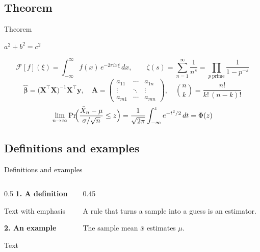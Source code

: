 \documentclass[aspectratio=1610,xcolor=dvipsnames]{beamer}
\begin{document}
\subsection{Theorem}
\begin{frame}{Theorem}
    \begin{theorem}[Pythagoras]
        $a^{2}+b^{2}=c^{2}$
    \end{theorem}

    \begin{theorem}
        \[
            \mathcal{F}[f](\xi)=\int_{-\infty}^{\infty} f(x)\,e^{-2\pi i x\xi}\,dx,\qquad
            \zeta(s)=\sum_{n=1}^{\infty}\frac{1}{n^{s}}=\prod_{p\ \mathrm{prime}}\frac{1}{1-p^{-s}}
        \]
        \[
            \hat{\boldsymbol\beta}=\bigl(\mathbf{X}^{\top}\mathbf{X}\bigr)^{-1}\mathbf{X}^{\top}\mathbf{y},\quad
            \mathbf{A}=\begin{pmatrix}a_{11}&\cdots&a_{1n}\\\vdots&\ddots&\vdots\\a_{m1}&\cdots&a_{mn}\end{pmatrix},\quad
            \binom{n}{k}=\frac{n!}{k!\,(n-k)!}
        \]
        \[
            \lim_{n\to\infty}\Pr\!\Bigl(\frac{\bar{X}_n-\mu}{\sigma/\sqrt{n}}\le z\Bigr)
            =\frac{1}{\sqrt{2\pi}}\int_{-\infty}^{z}e^{-t^{2}/2}\,dt=\Phi(z)
        \]
    \end{theorem}
\end{frame}

\subsection{Definitions and examples}
\begin{frame}[fragile]{Definitions and examples}
\begin{columns}[T,onlytextwidth]
\begin{column}{0.5\textwidth}
\textbf{1. A definition}\par\smallskip
\begin{codeonly}
\begin{definition}[Title]
  Text with \alert{emphasis}
\end{definition}
\end{codeonly}
\smallskip
\textbf{2. An example}\par\smallskip
\begin{codeonly}
\begin{example}
  Text
\end{example}
\end{codeonly}
\end{column}
\begin{column}{0.45\textwidth}
\begin{definition}[Estimator]
    A rule that turns a sample into a guess is an \alert{estimator}.
\end{definition}
\begin{example}
    The sample mean $\bar{x}$ estimates $\mu$.
\end{example}
\end{column}
\end{columns}
\end{frame}
\end{document}
